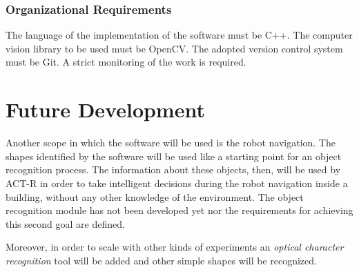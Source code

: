 			\subsubsection{Organizational Requirements}
			The language of the implementation of the software must be C++. 
			The computer vision library to be used must be OpenCV.
			The adopted version control system must be Git.
			A strict monitoring of the work is required.

	\section{Future Development}\label{futureDev}
		Another scope in which the software will be used is the robot navigation. 
		The shapes identified by the software will be used like a starting point for an object recognition process. 
		The information about these objects, then, will be used by ACT-R in order to take intelligent decisions during the robot navigation inside a building, without any other knowledge of the environment. 
		The object recognition module has not been developed yet nor the requirements for achieving this second goal are defined. 	

		Moreover, in order to scale with other kinds of experiments an \emph{optical character recognition} tool will be added and other simple shapes will be recognized.



